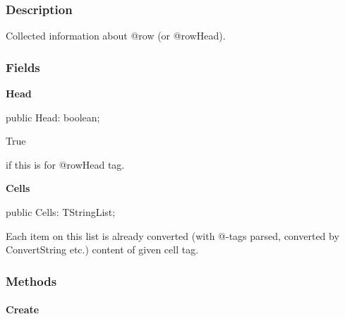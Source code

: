 \documentclass{report}
\newif\ifpdf
\begin{document}
\subsubsection*{\large{\textbf{Description}}\normalsize\hspace{1ex}\hfill}
Collected information about @row (or @rowHead).\subsubsection*{\large{\textbf{Fields}}\normalsize\hspace{1ex}\hfill}
\begin{list}{}{
\setlength{\itemindent}{0cm}
\setlength{\listparindent}{0cm}
\setlength{\leftmargin}{\evensidemargin}
\addtolength{\leftmargin}{\tmplength}
\settowidth{\labelsep}{X}
\addtolength{\leftmargin}{\labelsep}
\setlength{\labelwidth}{\tmplength}
}
\label{PasDoc_Gen.TRowData-Head}
\item[\textbf{Head}\hfill]
\ifpdf
\begin{flushleft}
\fi
\begin{ttfamily}
public Head: boolean;\end{ttfamily}

\ifpdf
\end{flushleft}
\fi


\par \begin{ttfamily}True\end{ttfamily} if this is for @rowHead tag.\label{PasDoc_Gen.TRowData-Cells}
\item[\textbf{Cells}\hfill]
\ifpdf
\begin{flushleft}
\fi
\begin{ttfamily}
public Cells: TStringList;\end{ttfamily}

\ifpdf
\end{flushleft}
\fi


\par Each item on this list is already converted (with @{-}tags parsed, converted by ConvertString etc.) content of given cell tag.\end{list}
\subsubsection*{\large{\textbf{Methods}}\normalsize\hspace{1ex}\hfill}
\paragraph*{Create}\hspace*{\fill}
\end{document}
